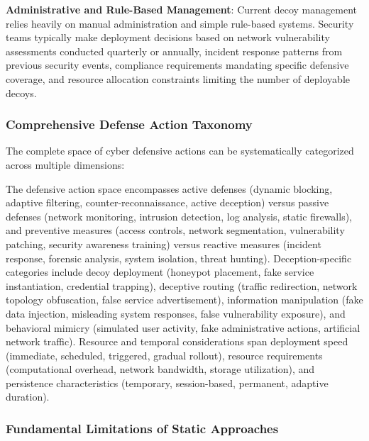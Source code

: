 \documentclass[12pt,oneside]{article}
\begin{document}
\textbf{Administrative and Rule-Based Management}: Current decoy management relies heavily on manual administration and simple rule-based systems. Security teams typically make deployment decisions based on network vulnerability assessments conducted quarterly or annually, incident response patterns from previous security events, compliance requirements mandating specific defensive coverage, and resource allocation constraints limiting the number of deployable decoys.

\subsubsection{Comprehensive Defense Action Taxonomy}

The complete space of cyber defensive actions can be systematically categorized across multiple dimensions:

The defensive action space encompasses active defenses (dynamic blocking, adaptive filtering, counter-reconnaissance, active deception) versus passive defenses (network monitoring, intrusion detection, log analysis, static firewalls), and preventive measures (access controls, network segmentation, vulnerability patching, security awareness training) versus reactive measures (incident response, forensic analysis, system isolation, threat hunting). Deception-specific categories include decoy deployment (honeypot placement, fake service instantiation, credential trapping), deceptive routing (traffic redirection, network topology obfuscation, false service advertisement), information manipulation (fake data injection, misleading system responses, false vulnerability exposure), and behavioral mimicry (simulated user activity, fake administrative actions, artificial network traffic). Resource and temporal considerations span deployment speed (immediate, scheduled, triggered, gradual rollout), resource requirements (computational overhead, network bandwidth, storage utilization), and persistence characteristics (temporary, session-based, permanent, adaptive duration).

\subsubsection{Fundamental Limitations of Static Approaches}
\end{document}
